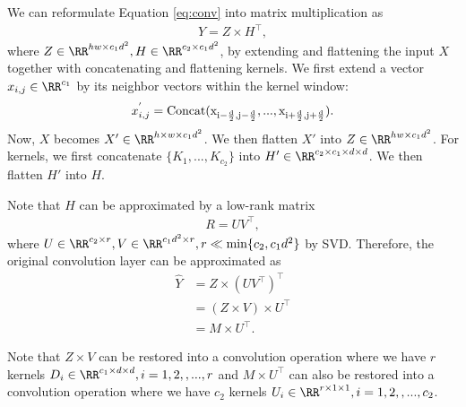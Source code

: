 We can reformulate Equation \eqref{eq:conv} into matrix multiplication as
\begin{align*}
    Y = Z \times H^{\top},
\end{align*}
where $Z \in \RR^{hw \times c_1 d^2}, H \in \RR^{c_2 \times c_1 d^2}$, by extending and flattening the input $X$ together with concatenating and flattening kernels. 
We first extend a vector $x_{i, j} \in \RR^{c_1}$ by its neighbor vectors within the kernel window: 
\begin{align*}
    x_{i, j}^{'} = \rm{Concat}(x_{i-\frac{d}{2}, j-\frac{d}{2}}, ..., x_{i+\frac{d}{2}, j+\frac{d}{2}}).
\end{align*}
Now, $X$ becomes $X' \in \RR^{h \times w \times c_1 d^2}$. We then flatten $X'$ into $Z \in \RR^{hw \times c_1 d^2}$.
For kernels, we first concatenate $\{K_1, ..., K_{c_2}\}$ into $H' \in \RR^{c_2 \times c_1 \times d \times d}$. We then flatten $H'$ into $H$.

Note that $H$ can be approximated by a low-rank matrix
\begin{align*}
    R = UV^{\top},
\end{align*}
where $U \in \RR^{c_2 \times r}, V \in \RR^{c_1 d^2 \times r}, r \ll \min\{c_2, c_1 d^2\}$ by SVD. Therefore, the original convolution layer can be approximated as 
\begin{align}
    \hat{Y} &= Z \times (UV^{\top})^{\top} \\
              &= (Z \times V) \times U^{\top} \\
              &= M \times U^{\top}.
\end{align}

Note that $Z \times V$ can be restored into a convolution operation where we have $r$ kernels $D_i \in \RR^{c_1 \times d \times d}, i=1, 2,, ..., r$ and $M \times U^{\top}$ can also be restored into a convolution operation where we have $c_2$ kernels $U_i \in \RR^{r \times 1 \times 1}, i=1, 2,, ..., c_2$. 





